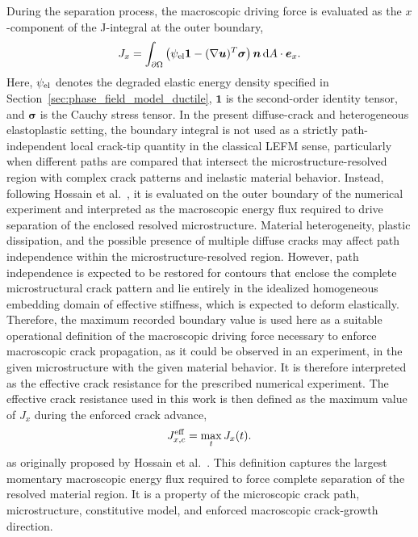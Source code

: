\documentclass[pamm,a4paper,fleqn]{w-art}
\newcommand{\added}[2][]{#2}
\newcommand{\Jeff}{J_{x,c}^{\rm eff}}
\begin{document}
During the separation process, the macroscopic driving force is
evaluated as the \(x\)-component of the J-integral at the outer
boundary,
\begin{equation}
  J_x = \int_{\partial\Omega}
  \left(
  \psi_{\rm el}\boldsymbol{1}
  - (\nabla\boldsymbol{u})^T\boldsymbol{\sigma}
  \right)
  \boldsymbol{n}\,{\rm d}A \cdot \boldsymbol{e}_x .
  \label{eq:J-integral}
\end{equation}
\added{Here, \(\psi_{\rm el}\) denotes the degraded elastic energy density
specified in Section}~\ref{sec:phase_field_model_ductile},
\added{\(\boldsymbol{1}\) is the second-order identity tensor, and
\(\boldsymbol{\sigma}\) is the Cauchy stress tensor. In the present
diffuse-crack and heterogeneous elastoplastic setting, the boundary
integral is not used as a strictly path-independent local crack-tip
quantity in the classical LEFM sense, particularly when different
paths are compared that intersect the microstructure-resolved region
with complex crack patterns and inelastic material behavior.
Instead, following Hossain et
al.}~\cite{hossain_effective_2014}, \added{it is evaluated on the outer
boundary of the numerical experiment and interpreted as the
macroscopic energy flux required to drive separation of the enclosed
resolved microstructure. Material heterogeneity, plastic
dissipation, and the possible presence of multiple diffuse cracks may
affect path independence within the microstructure-resolved region.
However, path independence is expected to be restored for contours
that enclose the complete microstructural crack pattern and lie
entirely in the idealized homogeneous embedding domain of effective
stiffness, which is expected to deform elastically. Therefore, the
maximum recorded boundary value is used here as a suitable
operational definition of the macroscopic driving force necessary to
enforce macroscopic crack propagation, as it could be observed in an
experiment, in the given microstructure with the given material
behavior. It is therefore interpreted as the effective crack
resistance for the prescribed numerical experiment.}
The effective crack resistance used in this work is then defined as
the maximum value of \(J_x\) during the enforced crack advance,
\begin{equation}
  \Jeff = \max_t J_x(t).
  \label{eq:effective_resistance}
\end{equation}
as originally proposed by Hossain
et al.~\cite{hossain_effective_2014}. This definition captures the
largest momentary macroscopic energy flux required
to force complete separation of the resolved material region. It is
a property of the microscopic crack path, microstructure,
constitutive model, and enforced macroscopic crack-growth direction.
\end{document}
